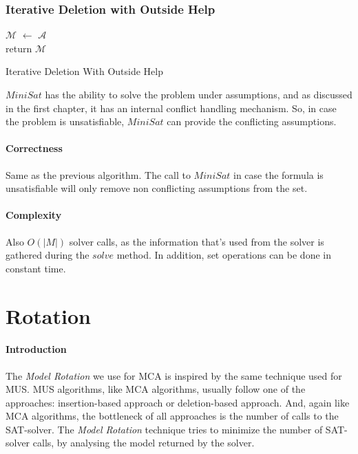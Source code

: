 \documentclass[]{article}
\newcommand{\msat}[0]{$MiniSat$ }
\begin{document}
		\subsubsection{Iterative Deletion with Outside Help}
			\begin{algorithm}[H]
				$ \mathcal{M} $ $\leftarrow$ $ \mathcal{A} $\\
				return $ \mathcal{M} $
				\caption{Iterative Deletion With Outside Help}
			\end{algorithm}
		
		\msat has the ability to solve the problem under assumptions, and as discussed in the first chapter, it has an internal conflict handling mechanism. So, in case the problem is unsatisfiable, \msat can provide the conflicting assumptions.
		
		\paragraph{Correctness} Same as the previous algorithm. The call to \msat in case the formula is unsatisfiable will only remove non conflicting assumptions from the set.
		
		\paragraph{Complexity} Also $ O \left( | M |\right) $ solver calls, as the information that's used from the solver is gathered during the $ solve $ method. In addition, set operations can be done in constant time.
		
	\pagebreak
	\section{Rotation}
	\paragraph{Introduction} The \textit{Model Rotation} we use for MCA is inspired by the same technique used for MUS. MUS algorithms, like MCA algorithms, usually follow one of the approaches: insertion-based approach or deletion-based approach. And, again like MCA algorithms, the bottleneck of all approaches is the number of calls to the SAT-solver\cite{Rotation}. The \textit{Model Rotation} technique tries to minimize the number of SAT-solver calls, by analysing the model returned by the solver.
		
\end{document}
